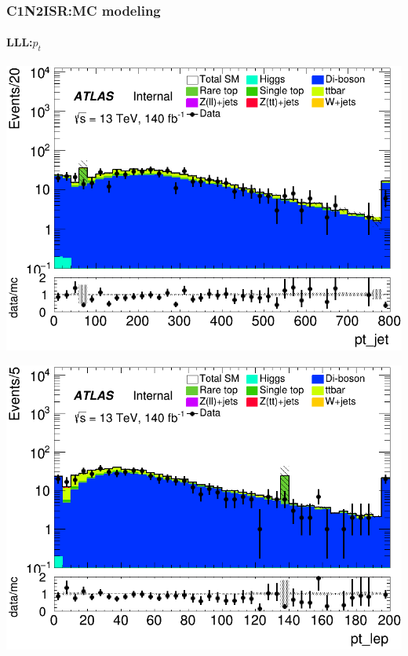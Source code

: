 \documentclass[usenames,dvipsnames]{beamer}
\begin{document}
\begin{frame}
\frametitle{C1N2ISR:MC modeling}
\framesubtitle{LLL:\quad $p_t$}
    \begin{minipage}{0.32\textwidth}
        \centering
        \includegraphics[width=\textwidth]{graphics/LLL_met/LLL_met_pt_jet.png}
    \end{minipage}
    \hfill
    \begin{minipage}{0.32\textwidth}
        \centering
        \includegraphics[width=\textwidth]{graphics/LLL_met/LLL_met_pt_lep.png}
    \end{minipage}
    \hfill
    \begin{minipage}{0.32\textwidth}
        \centering

\end{minipage}
\end{frame}
\end{document}

